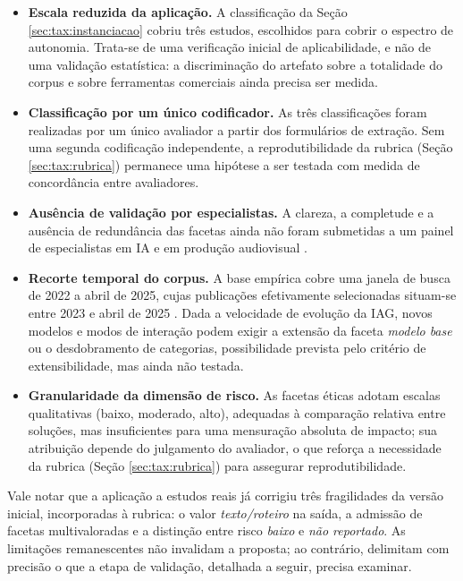 \begin{itemize}
    \item \textbf{Escala reduzida da aplicação.} A classificação da Seção \ref{sec:tax:instanciacao} cobriu três estudos, escolhidos para cobrir o espectro de autonomia. Trata-se de uma verificação inicial de aplicabilidade, e não de uma validação estatística: a discriminação do artefato sobre a totalidade do corpus e sobre ferramentas comerciais ainda precisa ser medida.
    \item \textbf{Classificação por um único codificador.} As três classificações foram realizadas por um único avaliador a partir dos formulários de extração. Sem uma segunda codificação independente, a reprodutibilidade da rubrica (Seção \ref{sec:tax:rubrica}) permanece uma hipótese a ser testada com medida de concordância entre avaliadores.
    \item \textbf{Ausência de validação por especialistas.} A clareza, a completude e a ausência de redundância das facetas ainda não foram submetidas a um painel de especialistas em IA e em produção audiovisual \citep{szopinski2019}.
    \item \textbf{Recorte temporal do corpus.} A base empírica cobre uma janela de busca de 2022 a abril de 2025, cujas publicações efetivamente selecionadas situam-se entre 2023 e abril de 2025 \citep{RothAleo2026}. Dada a velocidade de evolução da IAG, novos modelos e modos de interação podem exigir a extensão da faceta \textit{modelo base} ou o desdobramento de categorias, possibilidade prevista pelo critério de extensibilidade, mas ainda não testada.
    \item \textbf{Granularidade da dimensão de risco.} As facetas éticas adotam escalas qualitativas (baixo, moderado, alto), adequadas à comparação relativa entre soluções, mas insuficientes para uma mensuração absoluta de impacto; sua atribuição depende do julgamento do avaliador, o que reforça a necessidade da rubrica (Seção \ref{sec:tax:rubrica}) para assegurar reprodutibilidade.
\end{itemize}

Vale notar que a aplicação a estudos reais já corrigiu três fragilidades da versão inicial, incorporadas à rubrica: o valor \textit{texto/roteiro} na saída, a admissão de facetas multivaloradas e a distinção entre risco \textit{baixo} e \textit{não reportado}. As limitações remanescentes não invalidam a proposta; ao contrário, delimitam com precisão o que a etapa de validação, detalhada a seguir, precisa examinar.

